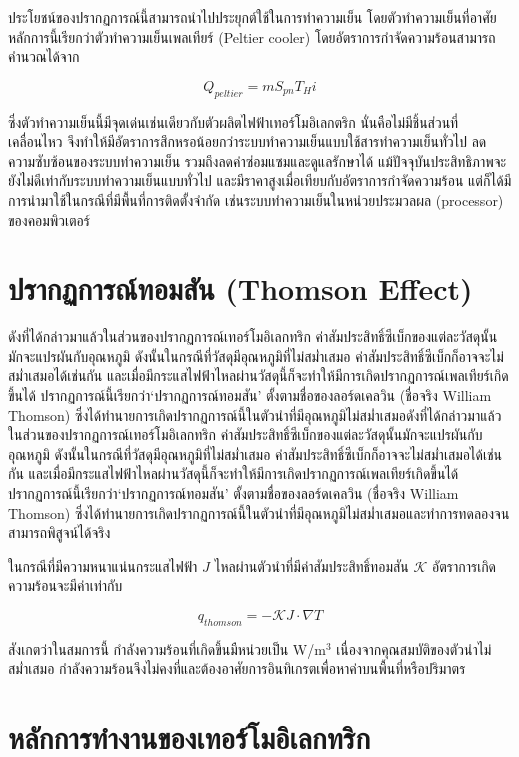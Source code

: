 \message{ !name(solar.tex)}\documentclass[
a4paper,
svgnames,
openany,
justified,
]{tufte-book}
\begin{document}
ประโยชน์ของปรากฏการณ์นี้สามารถนำไปประยุกต์ใช้ในการทำความเย็น โดยตัวทำความเย็นที่อาศัยหลักการนี้เรียกว่าตัวทำความเย็นเพลเทียร์ (Peltier cooler) โดยอัตราการกำจัดความร้อนสามารถคำนวณได้จาก

$$ Q_{peltier} = m S_{pn} T_H i $$

ซึ่งตัวทำความเย็นนี้มีจุดเด่นเช่นเดียวกับตัวผลิตไฟฟ้าเทอร์โมอิเลกตริก นั่นคือไม่มีชิ้นส่วนที่เคลื่อนไหว จึงทำให้มีอัตราการสึกหรอน้อยกว่าระบบทำความเย็นแบบใช้สารทำความเย็นทั่วไป ลดความซับซ้อนของระบบทำความเย็น รวมถึงลดค่าซ่อมแซมและดูแลรักษาได้ แม้ปัจจุบันประสิทธิภาพจะยังไม่ดีเท่ากับระบบทำความเย็นแบบทั่วไป และมีราคาสูงเมื่อเทียบกับอัตราการกำจัดความร้อน แต่ก็ได้มีการนำมาใช้ในกรณีที่มีพื้นที่การติดตั้งจำกัด เช่นระบบทำความเย็นในหน่วยประมวลผล (processor) ของคอมพิวเตอร์

\section{ปรากฏการณ์ทอมสัน (Thomson Effect)}

ดังที่ได้กล่าวมาแล้วในส่วนของปรากฏการณ์เทอร์โมอิเลกทริก ค่าสัมประสิทธิ์ซีเบ็กของแต่ละวัสดุนั้นมักจะแปรผันกับอุณหภูมิ ดังนั้นในกรณีที่วัสดุมีอุณหภูมิที่ไม่สม่ำเสมอ ค่าสัมประสิทธิ์ซีเบ็กก็อาจจะไม่สม่ำเสมอได้เช่นกัน และเมื่อมีกระแสไฟฟ้าไหลผ่านวัสดุนี้ก็จะทำให้มีการเกิดปรากฏการณ์เพลเทียร์เกิดขึ้นได้ ปรากฏการณ์นี้เรียกว่า`ปรากฏการณ์ทอมสัน' ตั้งตามชื่อของลอร์ดเคลวิน (ชื่อจริง William Thomson) ซึ่งได้ทำนายการเกิดปรากฏการณ์นี้ในตัวนำที่มีอุณหภูมิไม่สม่ำเสมอดังที่ได้กล่าวมาแล้วในส่วนของปรากฏการณ์เทอร์โมอิเลกทริก ค่าสัมประสิทธิ์ซีเบ็กของแต่ละวัสดุนั้นมักจะแปรผันกับอุณหภูมิ ดังนั้นในกรณีที่วัสดุมีอุณหภูมิที่ไม่สม่ำเสมอ ค่าสัมประสิทธิ์ซีเบ็กก็อาจจะไม่สม่ำเสมอได้เช่นกัน และเมื่อมีกระแสไฟฟ้าไหลผ่านวัสดุนี้ก็จะทำให้มีการเกิดปรากฏการณ์เพลเทียร์เกิดขึ้นได้ ปรากฏการณ์นี้เรียกว่า`ปรากฏการณ์ทอมสัน' ตั้งตามชื่อของลอร์ดเคลวิน (ชื่อจริง William Thomson) ซึ่งได้ทำนายการเกิดปรากฏการณ์นี้ในตัวนำที่มีอุณหภูมิไม่สม่ำเสมอและทำการทดลองจนสามารถพิสูจน์ได้จริง 

ในกรณีที่มีความหนาแน่นกระแสไฟฟ้า $J$ ไหลผ่านตัวนำที่มีค่าสัมประสิทธิ์ทอมสัน $\mathcal{K}$ อัตราการเกิดความร้อนจะมีค่าเท่ากับ

$$ q_{thomson} = - \mathcal{K} J \cdot \nabla T $$

สังเกตว่าในสมการนี้ กำลังความร้อนที่เกิดขึ้นมืหน่วยเป็น W/m$^3$ เนื่องจากคุณสมบัติของตัวนำไม่สม่ำเสมอ กำลังความร้อนจึงไม่คงที่และต้องอาศัยการอินทิเกรตเพื่อหาค่าบนพื้นที่หรือปริมาตร

\section{หลักการทำงานของเทอร์โมอิเลกทริก}
\end{document}
